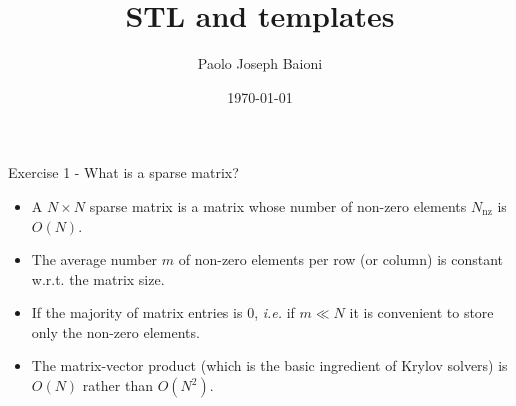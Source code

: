 \documentclass[10pt]{beamer}
\begin{document}
    \title{STL and templates}
    \author{Paolo Joseph Baioni}
    \date{\today}

\begin{frame}
    \maketitle
\end{frame}


\begin{frame}{Exercise 1 - What is a sparse matrix?}
\begin{itemize}
\item A $N \times N$ sparse matrix is a matrix whose number of non-zero elements $N_\mathrm{nz}$ is $O(N)$. \\[3mm]
\item The average number $m$ of non-zero elements per row (or column)
is constant w.r.t. the matrix size. \\[3mm]
\item If the majority of matrix entries is $0$, {\it i.e.} if $m \ll N$ it is convenient to store only the non-zero elements.\\[3mm]
\item The matrix-vector product (which is the basic ingredient of Krylov solvers) is $O(N)$ rather than $O(N^{2})$.\\[3mm]
\end{itemize}
\end{frame}
\end{document}
